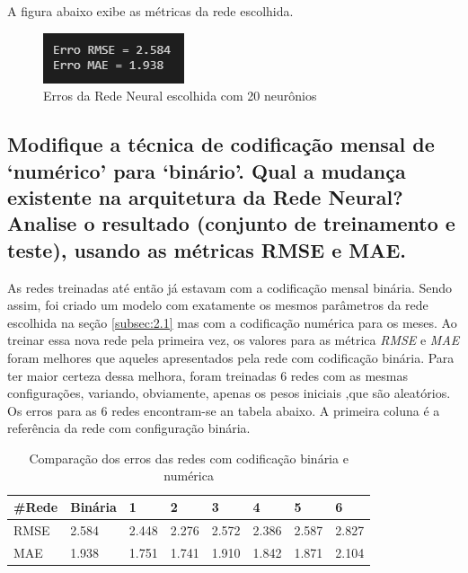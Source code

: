 \documentclass[12pt]{article}
\begin{document}
	A figura abaixo exibe as métricas da rede escolhida.
	
	\begin{figure}[H]
		\centering
		\includegraphics[width=0.4\linewidth]{Imagens/onestep/erros20}
		\caption{Erros da Rede Neural escolhida com 20 neurônios}
		\label{fig:erros20}
	\end{figure}
	
	
	
	\subsection{Modifique a técnica de codificação mensal de ‘numérico’ para ‘binário’. Qual a mudança existente na arquitetura da Rede Neural? Analise o resultado (conjunto de treinamento e teste), usando as métricas RMSE e MAE.}
	
	As redes treinadas até então já estavam com a codificação mensal binária. Sendo assim, foi criado um modelo com exatamente os mesmos parâmetros da rede escolhida na seção \ref{subsec:2.1} mas com a codificação numérica para os meses. Ao treinar essa nova rede pela primeira vez, os valores para as métrica \textit{RMSE} e \textit{MAE} foram melhores que aqueles apresentados pela rede com codificação binária. Para ter maior certeza dessa melhora, foram treinadas 6 redes com as mesmas configurações, variando, obviamente, apenas os pesos iniciais ,que são aleatórios. Os erros para as 6 redes encontram-se an tabela abaixo. A primeira coluna é a referência da rede com configuração binária.
	
	\begin{table}[H]\label{tab:binnum}
		\begin{tabular}{|l|l|l|l|l|l|l|l|}
			\hline
			\#Rede & Binária & 1     & 2     & 3     & 4     & 5     & 6     \\ \hline
			RMSE   & 2.584   & 2.448 & 2.276 & 2.572 & 2.386 & 2.587 & 2.827 \\ \hline
			MAE    & 1.938   & 1.751 & 1.741 & 1.910 & 1.842 & 1.871 & 2.104 \\ \hline
		\end{tabular}
		\centering
		\caption{Comparação dos erros das redes com codificação binária e numérica}
	\end{table}
	
\end{document}

